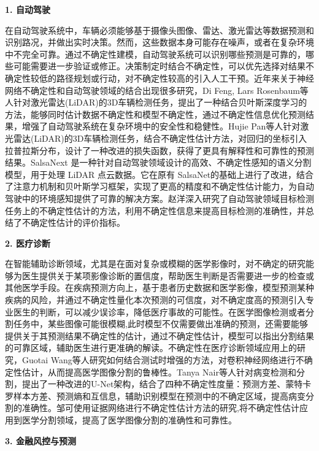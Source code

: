 \textbf{1. 自动驾驶}

在自动驾驶系统中，车辆必须能够基于摄像头图像、雷达、激光雷达等数据预测和识别路况，并做出实时决策。然而，这些数据本身可能存在噪声，或者在复杂环境中不完全可靠。通过不确定性建模，自动驾驶系统可以识别哪些预测是可靠的，哪些可能需要进一步验证或修正。决策制定时结合不确定性，可以优先选择对结果不确定性较低的路径规划或行动，对不确定性较高的引入人工干预。近年来关于神经网络不确定性和自动驾驶领域的结合出现很多研究，Di Feng, Lars Rosenbaum等人\cite{feng2018towards}针对激光雷达(LiDAR)的3D车辆检测任务，提出了一种结合贝叶斯深度学习的方法，能够同时估计数据不确定性和模型不确定性，通过不确定性信息优化预测结果，增强了自动驾驶系统在复杂环境中的安全性和稳健性。Hujie Pan等人\cite{pan2020towards}针对激光雷达(LiDAR)的3D车辆检测任务，结合不确定性估计方法，对回归的坐标引入拉普拉斯分布，设计了一种改进的损失函数，获得了更具有解释性和可靠性的预测结果。SalsaNext\cite{cortinhal2020salsanext} 是一种针对自动驾驶领域设计的高效、不确定性感知的语义分割模型，用于处理 LiDAR 点云数据。它在原有 SalsaNet\cite{Aksoy2019SalsaNetFR}的基础上进行了改进，结合了注意力机制和贝叶斯学习框架，实现了更高的精度和不确定性估计能力，为自动驾驶中的环境感知提供了可靠的解决方案。赵洋\cite{QCYK202405002}深入研究了自动驾驶领域目标检测任务上的不确定性估计的方法，利用不确定性信息来提高目标检测的准确性，并总结了不确定性估计的评价指标。

\textbf{2. 医疗诊断}

在智能辅助诊断领域，尤其是在面对复杂或模糊的医学影像时，对不确定的研究能够为医生提供关于某项影像诊断的置信度，帮助医生判断是否需要进一步的检查或其他医学手段。在疾病预测方向上，基于患者历史数据和医学影像，模型预测某种疾病的风险，并通过不确定性量化本次预测的可信度，对不确定度高的预测引入专业医生的判断，可以减少误诊率，降低医疗事故的可能性。在医学图像检测或者分割任务中，某些图像可能很模糊,此时模型不仅需要做出准确的预测，还需要能够提供关于其预测结果不确定性的估计，通过不确定性估计，模型可以指出分割结果的可靠区域，辅助医生进行更准确的解读。不确定性在医疗诊断领域应用上的研究，Guotai Wang等人\cite{wang2019aleatoric}研究如何结合测试时增强的方法，对卷积神经网络进行不确定性估计，从而提高医学图像分割的鲁棒性。Tanya Nair等人\cite{nair2020exploring}针对病变检测和分割，提出了一种改进的U-Net架构，结合了四种不确定性度量：预测方差、蒙特卡罗样本方差、预测熵和互信息，辅助识别模型在预测中的不确定区域，提高病变分割的准确性。邹可\cite{1024642336.nh}使用证据网络进行不确定性估计方法的研究,将不确定性估计应用到医学分割领域，提高了医学图像分割的准确性和可靠性。


\textbf{3. 金融风控与预测}

